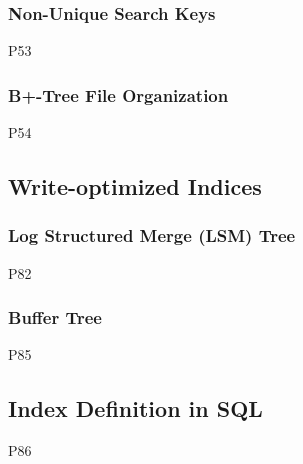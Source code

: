 \subsubsection{Non-Unique Search Keys}
 P53

\subsubsection{B+-Tree File Organization}
 P54


\subsection{Write-optimized Indices}

\subsubsection{Log Structured Merge (LSM) Tree}
 P82

\subsubsection{Buffer Tree}
 P85

\subsection{Index Definition in SQL}
 P86